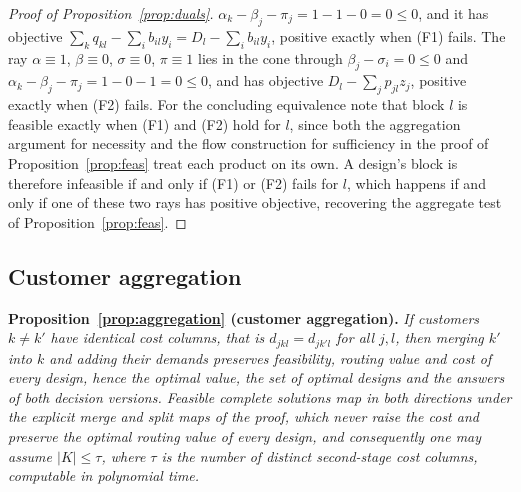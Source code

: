 \begin{proof}[Proof of Proposition~\ref{prop:duals}]
$\alpha_k-\beta_j-\pi_j=1-1-0=0\le 0$, and it has objective
$\sum_k q_{kl}-\sum_i b_{il}y_i=D_l-\sum_i b_{il}y_i$, positive exactly
when (F1) fails. The ray $\alpha\equiv 1$, $\beta\equiv 0$, $\sigma\equiv
0$, $\pi\equiv 1$ lies in the cone through $\beta_j-\sigma_i=0\le 0$
and $\alpha_k-\beta_j-\pi_j=1-0-1=0\le 0$, and has objective
$D_l-\sum_j p_{jl}z_j$, positive exactly
when (F2) fails. For the concluding equivalence note that block $l$ is
feasible exactly when (F1) and (F2) hold for $l$, since both the
aggregation argument for necessity and the flow construction for
sufficiency in the proof of Proposition~\ref{prop:feas} treat each
product on its own. A design's block is therefore infeasible if and only
if (F1) or (F2) fails for $l$, which happens if and only if one of
these two rays has positive objective, recovering the aggregate test of
Proposition~\ref{prop:feas}.
\end{proof}

\subsection{Customer aggregation}\label{app:agg}

\noindent
\textbf{Proposition~\ref{prop:aggregation} (customer aggregation).}
\emph{If customers $k\ne k'$ have identical cost columns, that is
$d_{jkl}=d_{jk'l}$ for all $j,l$, then merging $k'$ into $k$ and adding
their demands preserves feasibility, routing value and cost of every
design, hence the optimal value, the set of optimal designs and the
answers of both decision versions. Feasible complete solutions
map in both directions under the explicit merge and split maps of the
proof, which never raise the cost and preserve the optimal routing
value of every design, and consequently one
may assume $|K|\le\tau$, where $\tau$
is the number of distinct second-stage cost columns, computable in
polynomial time.}

